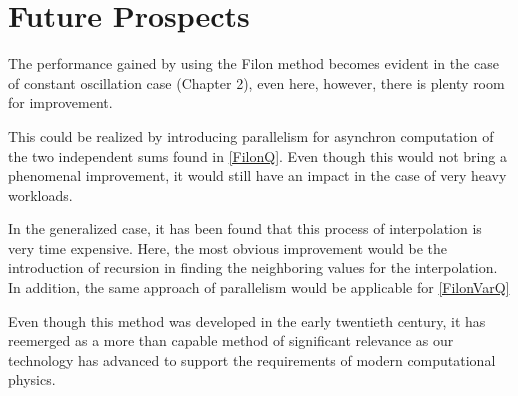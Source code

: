 \vspace{0.1in}

\section{Future Prospects}

The performance gained by using the Filon method becomes evident in the case of constant oscillation case (Chapter 2),
even here, however, there is plenty room for improvement.

This could be realized by introducing parallelism for asynchron computation of the two independent sums
found in \eqref{FilonQ}. Even though this would not bring a phenomenal improvement, it would still have an impact
in the case of very heavy workloads.

\vspace{0.1in}


In the generalized case, it has been found that this process of interpolation is very
time expensive. Here, the most obvious improvement would be the introduction of recursion in finding the
neighboring values for the interpolation. In addition, the same approach of parallelism
would be applicable for \eqref{FilonVarQ} 

\vspace{0.1in}

Even though this method was developed in the early twentieth century, 
it has reemerged as a more than capable method of significant relevance as our technology
has advanced to support the requirements of modern computational physics.